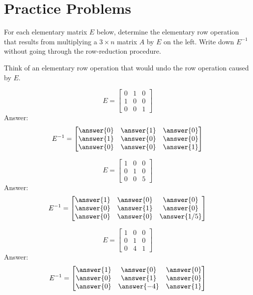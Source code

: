 \documentclass{ximera}
\begin{document}
\section*{Practice Problems}


\begin{problem}
For each elementary matrix $E$ below, determine the elementary row operation that results from multiplying a $3\times n$ matrix $A$ by $E$ on the left.  Write down $E^{-1}$ without going through the row-reduction procedure.
\begin{hint}
Think of an elementary row operation that would undo the row operation caused by $E$.
\end{hint}

\begin{problem}
$$E=\begin{bmatrix}0&1&0\\1&0&0\\0&0&1\end{bmatrix}$$
Answer:
$$E^{-1}=\begin{bmatrix}\answer{0}&\answer{1}&\answer{0}\\\answer{1}&\answer{0}&\answer{0}\\\answer{0}&\answer{0}&\answer{1}\end{bmatrix}$$
\end{problem}

\begin{problem}
$$E=\begin{bmatrix}1&0&0\\0&1&0\\0&0&5\end{bmatrix}$$
Answer:
$$E^{-1}=\begin{bmatrix}\answer{1}&\answer{0}&\answer{0}\\\answer{0}&\answer{1}&\answer{0}\\\answer{0}&\answer{0}&\answer{1/5}\end{bmatrix}$$
\end{problem}

\begin{problem}
$$E=\begin{bmatrix}1&0&0\\0&1&0\\0&4&1\end{bmatrix}$$
Answer:
$$E^{-1}=\begin{bmatrix}\answer{1}&\answer{0}&\answer{0}\\\answer{0}&\answer{1}&\answer{0}\\\answer{0}&\answer{-4}&\answer{1}\end{bmatrix}$$
\end{problem}

\end{problem}
\end{document}
